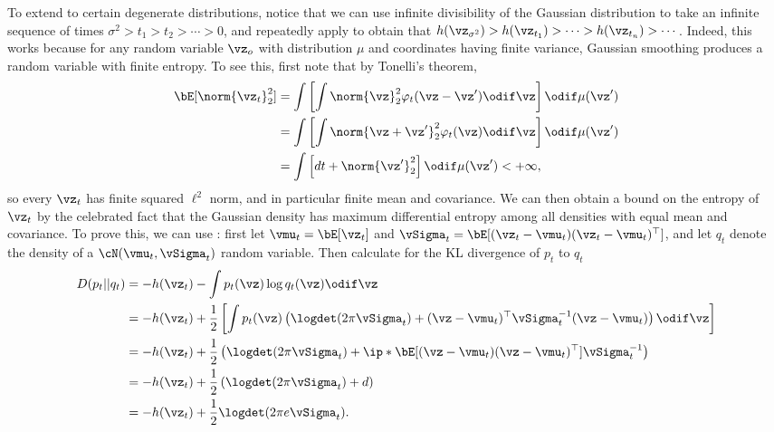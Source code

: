 \documentclass[../../book-main.tex]{subfiles}
\begin{document}
\begin{remark}
  To extend  to certain degenerate
  distributions,
  notice that we can use infinite divisibility of the Gaussian distribution to
  take an infinite sequence of times $\sigma^2 > t_1 > t_2 > \cdots > 0$, and
  repeatedly apply  to obtain that
  $h(\vz_{\sigma^2}) > h(\vz_{t_1}) > \cdots > h(\vz_{t_n}) > \cdots$.
  Indeed, this works because for any random variable $\vz_o$ with distribution
  $\mu$ and coordinates having finite variance, Gaussian smoothing produces
  a random variable with finite entropy. To see this, first note that by
  Tonelli's theorem,
  \begin{align*}
    \bE[\norm{\vz_t}_2^2] 
    &= \int \left[ \int \norm{\vz}_2^2 \varphi_t(\vz - \vz') \odif \vz
    \right] \odif \mu(\vz')\\
    &= \int \left[ \int \norm{\vz + \vz'}_2^2 \varphi_t(\vz) \odif \vz
    \right] \odif \mu(\vz')\\
    &= \int\left[dt + \norm{\vz'}_2^2 \right]\odif \mu(\vz') <+\infty,
  \end{align*}
  so every $\vz_t$ has finite squared $\ell^2$ norm, and in particular finite
  mean and covariance.
  We can then obtain a bound on the entropy of $\vz_t$ by the celebrated fact
  that the Gaussian density has maximum differential entropy among all densities
  with equal mean and covariance.
  To prove this, we can use : first let $\vmu_t
  = \bE[\vz_t]$ and $\vSigma_t = \bE[(\vz_t-\vmu_t) (\vz_t-\vmu_t)^\top]$, and let $q_t$ denote
  the density of a $\cN(\vmu_t, \vSigma_t)$ random variable.
  Then calculate for the KL divergence of $p_t$ to $q_t$
  \begin{align*}
    D(p_t || q_t) 
    &= 
    -h(\vz_t) - \int p_t(\vz) \log q_t(\vz) \odif \vz
    \\
    &=
    -h(\vz_t) + \frac{1}{2}\left[
      \int p_t(\vz) \left( \logdet(2\pi \vSigma_t) + (\vz - \vmu_t)^\top \vSigma_t^{-1} (\vz - \vmu_t) \right)\odif \vz
    \right]
  \\
    &= -h(\vz_t) + \frac{1}{2} \left(
      \logdet(2\pi \vSigma_t) 
      + \ip*{\bE[(\vz - \vmu_t)(\vz - \vmu_t)^\top]}{\vSigma_t^{-1}}
    \right)
    \\
    &= -h(\vz_t) + \frac{1}{2} \left(
      \logdet(2\pi \vSigma_t) 
      + d
    \right)
    \\
    &= -h(\vz_t) + \frac{1}{2} \logdet(2\pi e \vSigma_t).
  \end{align*}

\end{remark}
\end{document}
